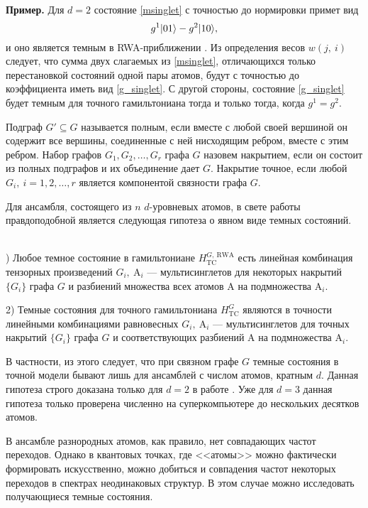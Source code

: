 \textbf{Пример.} Для $d=2$ состояние \eqref{msinglet} с точностью до нормировки примет вид 
\begin{equation}
	\label{g_singlet}
	g^{1}|01\rangle-g^{2}|10\rangle,
\end{equation}
и оно является темным в RWA-приближении \cite{ozhigov_qq, rwa_1, rwa_2}. Из определения весов $w(j,~i)$ следует, что сумма двух слагаемых из \eqref{msinglet}, отличающихся только перестановкой состояний одной пары атомов, будут с точностью до коэффициента иметь вид \eqref{g_singlet}. С другой стороны, состояние \eqref{g_singlet} будет темным для точного гамильтониана тогда и только тогда, когда $g^{1}=g^{2}$. 

Подграф $G'\subseteq G$ называется полным, если вместе с любой своей вершиной он содержит все вершины, соединенные с ней нисходящим ребром, вместе с этим ребром. Набор графов $G_{1},G_{2},\dots,G_{r}$ графа $G$ назовем накрытием, если он состоит из полных подграфов и их объединение дает $G$. Накрытие точное, если любой $G_{i},~i=1,2,\dots,r$ является компонентой связности графа $G$. 

Для ансамбля, состоящего из $n$ $d$-уровневых атомов, в свете работы \cite{kulagin_homogeneous} правдоподобной является следующая гипотеза о явном виде темных состояний. 

\clearpage
\begin{hyp}
	\
	\\
	) Любое темное состояние в гамильтониане $H^{G,~\text{RWA}}_{\text{TC}}$ есть линейная комбинация тензорных произведений $G_{i},~\text{A}_{i}$ --- мультисинглетов для некоторых накрытий $\{ G_{i}\}$ графа $G$ и разбиений множества всех атомов $\text{A}$ на подмножества $\text{A}_{i}$. 
	
	2) Темные состояния для точного гамильтониана $H^G_{\text{TC}}$ являются в точности линейными комбинациями равновесных $G_{i},~\text{A}_{i}$ --- мультисинглетов для точных накрытий $\{ G_{i}\}$ графа $G$ и соответствующих разбиений $\text{A}$ на подмножества $\text{A}_{i}$. 
\end{hyp}

В частности, из этого следует, что при связном графе $G$ темные состояния в точной модели бывают лишь для ансамблей с числом атомов, кратным $d$. Данная гипотеза строго доказана только для $d=2$ в работе \cite{ozhigov_dimension}. Уже для $d=3$ данная гипотеза только проверена численно на суперкомпьютере до нескольких десятков атомов. 

В ансамбле разнородных атомов, как правило, нет совпадающих частот переходов. Однако в квантовых точках, где <<атомы>> можно фактически формировать искусственно, можно добиться и совпадения частот некоторых переходов в спектрах неодинаковых структур. В этом случае можно исследовать получающиеся темные состояния.

